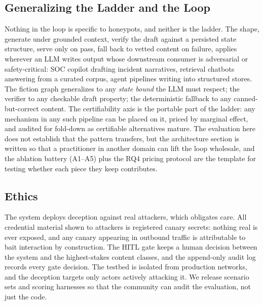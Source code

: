 \subsection{Generalizing the Ladder and the Loop}
Nothing in the loop is specific to honeypots, and neither is the ladder.
The shape, generate under
grounded context, verify the draft against a persisted state structure,
serve only on pass, fall back to vetted content on failure, applies
wherever an LLM writes output whose downstream consumer is adversarial or
safety-critical: SOC copilot drafting incident narratives, retrieval
chatbots answering from a curated corpus, agent pipelines writing into
structured stores. The fiction graph generalizes to any \emph{state
bound} the LLM must respect; the verifier to any checkable draft
property; the deterministic fallback to any canned-but-correct content.
The certifiability axis is the portable part of the ladder: any
mechanism in any such pipeline can be placed on it, priced by marginal
effect, and audited for fold-down as certifiable alternatives mature.
The evaluation here does not establish that the
pattern transfers, but the
architecture section is written so that a practitioner in another domain
can lift the loop wholesale, and the ablation battery (A1--A5) plus the
RQ4 pricing protocol are the template for testing whether each piece
they keep contributes.

\subsection{Ethics}
The system deploys deception against real attackers, which obligates
care. All credential material shown to attackers is registered canary
secrets: nothing real is ever exposed, and any canary appearing in
outbound traffic is attributable to bait interaction by construction. The
HITL gate keeps a human decision between the system and the highest-stakes
content classes, and the append-only audit log records every gate
decision. The testbed is isolated from production networks, and the
deception targets only actors actively attacking it. We release scenario
sets and scoring harnesses so that the community can audit the
evaluation, not just the code.

